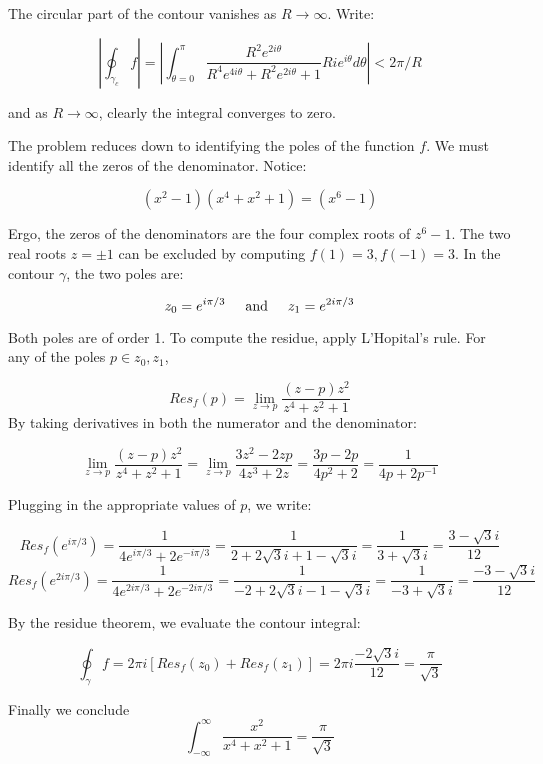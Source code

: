 \documentclass{article}
\newcommand{\textAnd}{
    {
        \hspace{5mm}
        \textrm{and}
        \hspace{5mm}
    }
}
\begin{document}
The circular part of the contour vanishes as $R \rightarrow \infty$. 
Write:

\[
    \left|\oint_{\gamma_c}f\right|
    =\left|\int_{\theta = 0}^{\pi}
    \frac{R^2e^{2i\theta}}{R^4e^{4i\theta}+R^2e^{2i\theta}+1}
    Rie^{i\theta}d\theta
    \right|
    <2\pi/R
\]

and as $R\rightarrow \infty$, clearly the integral converges to 
zero. 

The problem reduces down to identifying the poles of the function 
$f$. We must identify all the zeros of the denominator. Notice:

\[
    (x^2-1)(x^4+x^2+1) = (x^6-1)
\]

Ergo, the zeros of the denominators are the four complex roots
of $z^6 - 1$. The two real roots $z = \pm 1$ can be excluded 
by computing $f(1) = 3, f(-1) = 3$. In the contour $\gamma$, 
the two poles are:

\[
    z_0 = e^{i\pi/3} \textAnd z_1 = e^{2i\pi/3}
\]

Both poles are of order 1. To compute the residue, apply 
L'Hopital's rule. For any of the poles $p \in {z_0, z_1}$, 

\[
    Res_f(p) = \lim_{z\rightarrow p} 
    \frac{(z-p)z^2}{z^4+z^2+1}
\]
By taking derivatives in both the numerator and the denominator:

\[
    \lim_{z\rightarrow p} 
    \frac{(z-p)z^2}{z^4+z^2+1}
=
\lim_{z\rightarrow p} 
    \frac{3z^2-2zp}{4z^3+2z}
=
\frac{3p-2p}{4p^2+2}
=\frac{1}{4p+2p^{-1}}
\]

Plugging in the appropriate values of $p$, we write:

\[
    Res_f(e^{i\pi/3}) = 
    \frac{1}
    {
       4e^{i\pi/3}+2e^{-i\pi/3} 
    }
    =
    \frac{1}
    {
        2+2\sqrt{3}i
        +1-\sqrt{3}i
    }
    =\frac{1}
    {
        3+\sqrt{3}i
    }
    =\frac{3-\sqrt{3}i}{12}
    \]\[
  Res_f(e^{2i\pi/3}) = 
    \frac{1}
    {
       4e^{2i\pi/3}+2e^{-2i\pi/3} 
    }
    =
    \frac{1}
    {
        -2+2\sqrt{3}i
        -1-\sqrt{3}i
    }
    =
    \frac{1}
    {
        -3+\sqrt{3}i
    }
    =
    \frac{-3-\sqrt{3}i}
    {
        12
    }
\]

By the residue theorem, we evaluate the contour integral:

\[
    \oint_{\gamma}f = 2\pi i [Res_f(z_0)+Res_f(z_1)]
     = 2\pi i \frac{-2\sqrt{3}i}{12} = 
     \frac{\pi}{\sqrt{3}}
\]
\newpage

Finally we conclude 
\[
    \boxed{
        \int_{-\infty}^{\infty}
        \frac{x^2}{x^4+x^2+1} = 
        \frac{\pi} {\sqrt{3}}
    }
\]
\end{document}

